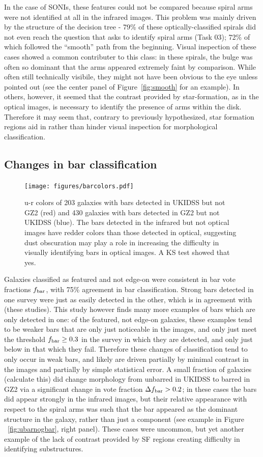 In the case of SONIs, these features could not be compared because spiral arms were not identified at all in the infrared images. This problem was mainly driven by the structure of the decision tree - 79\% of these optically-classified spirals did not even reach the question that asks to identify spiral arms (Task 03); 72\% of which followed the ``smooth'' path from the beginning. Visual inspection of these cases showed a common contributer to this class: in these spirals, the bulge was often so dominant that the arms appeared extremely faint by comparison. While often still technically visibile, they might not have been obvious to the eye unless pointed out (see the center panel of Figure~\ref{fig:smooth} for an example). In others, however, it seemed that the contrast provided by star-formation, as in the optical images, is necessary to identify the presence of arms within the disk. Therefore it may seem that, contrary to previously hypothesized, star formation regions aid in rather than hinder visual inspection for morphological classification.

\subsection{Changes in bar classification}
\begin{figure}
\centering
\texttt{[image: figures/barcolors.pdf]}
\caption{u-r colors of 203 galaxies with bars detected in UKIDSS but not GZ2 (red) and 430 galaxies with bars detected in GZ2 but not UKIDSS (blue). The bars detected in the infrared but not optical images have redder colors than those detected in optical, suggesting dust obscuration may play a role in increasing the difficulty in visually identifying bars in optical images. A KS test showed that yes. }
\label{fig:colorbar}
\end{figure}

Galaxies classified as featured and not edge-on were consistent in bar vote fractions $f_{\rm bar}$, with 75\% agreement in bar classification. Strong bars detected in one survey were just as easily detected in the other, which is in agreement with (these studies). This study however finds many more examples of bars which are only detected in one: of the featured, not edge-on galaxies, these examples tend to be weaker bars that are only just noticeable in the images, and only just meet the threshold $f_{\rm bar}\ge0.3$ in the survey in which they are detected, and only just below in that which they fail. Therefore these changes of classification tend to only occur in weak bars, and likely are driven partially by minimal contrast in the images and partially by simple statistical error. A small fraction of galaxies (calculate this) did change morphology from unbarred in UKIDSS to barred in GZ2 via a significant change in vote fraction $\Delta f_{\rm bar} > 0.2$; in these cases the bars did appear strongly in the infrared images, but their relative appearance with respect to the spiral arms was such that the bar appeared as the dominant structure in the galaxy, rather than just a component (see example in Figure ~\ref{fig:ubarnogbar}, right panel). These cases were uncommon, but yet another example of the lack of contrast provided by SF regions creating difficulty in identifying substructures. 

